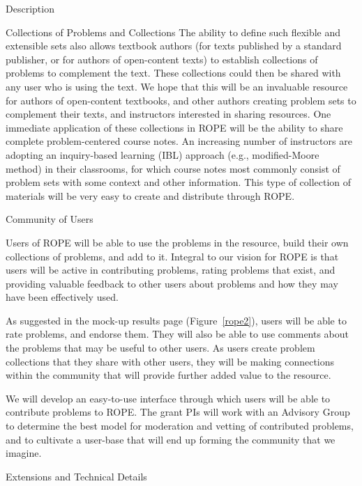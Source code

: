 \documentclass[11pt]{article}
\begin{document}
\begin{section}{Description}
\begin{subsection}{Collections of Problems and Collections}
The ability to define such flexible and extensible sets also allows 
textbook authors (for texts published by a standard publisher, or for
authors of open-content texts) to establish collections of problems to
complement the text.  These collections could then be shared with any user 
who is using the text.  We hope that this will be an invaluable resource
for authors of open-content textbooks, and other authors creating problem
sets to complement their texts, and instructors interested in sharing
resources.  One immediate application of these collections in ROPE will be the
ability to share complete problem-centered course notes.  An increasing
number of instructors are adopting an inquiry-based learning (IBL) approach (e.g., modified-Moore method) in their
classrooms, for which course notes most commonly consist of problem sets
with some context and other information.  This type of collection of
materials will be very easy to create and distribute through ROPE.

\end{subsection}

\begin{subsection}{Community of Users}

Users of ROPE will be able to use the problems in the resource, build
their own collections of problems, and add to it.  Integral to our vision
for ROPE is that users will be active in contributing problems, rating
problems that exist, and providing valuable feedback to other users about
problems and how they may have been effectively used.

As suggested in the mock-up results page (Figure~\ref{rope2}), users will
be able to rate problems, and endorse them.  They will also be
able to use comments about the problems that may be useful to other
users.  As users create problem collections that they share
with other users, they will be making connections within the community
that will provide further added value to the resource.  

We will develop an easy-to-use interface through which 
users will be able to contribute
problems to ROPE.  The grant PIs will work with an Advisory Group to
determine the best model for moderation and vetting of contributed
problems, and to cultivate a user-base that will end up forming the
community that we imagine.

\end{subsection}

\begin{subsection}{Extensions and Technical Details}


\end{subsection}
\end{section}
\end{document}
